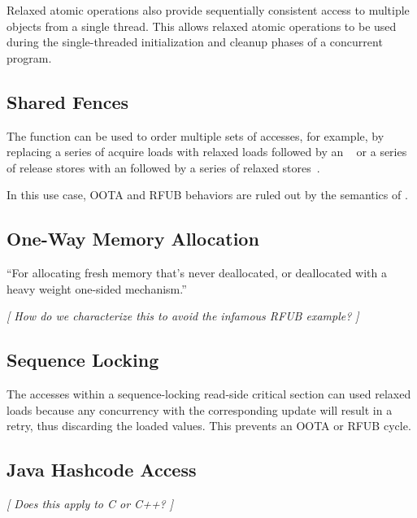\documentclass{article}
\begin{document}
Relaxed atomic operations also provide sequentially consistent access
to multiple objects from a single thread.
This allows relaxed atomic operations to be used during the single-threaded
initialization and cleanup phases of a concurrent program.

\subsection{Shared Fences}
\label{sec:Shared Fences}

The  function can be used to order
multiple sets of accesses, for example, by replacing a series of
acquire loads with relaxed loads followed by an
~\cite[Section 4.1]{RaulSilvera2007WeakMemoryModel}
or a series of release stores with an
 followed by
a series of relaxed stores~\cite[Section 4.2]{RaulSilvera2007WeakMemoryModel}.

In this use case, OOTA and RFUB behaviors are ruled out by the semantics
of .

\subsection{One-Way Memory Allocation}
\label{sec:One-Way Memory Allocation}

``For allocating fresh memory that's never deallocated, or deallocated
with a heavy weight one-sided mechanism.''

\emph{[ How do we characterize this to avoid the infamous RFUB example?  ]}

\subsection{Sequence Locking}
\label{sec:Sequence Locking}

The accesses within a sequence-locking read-side critical section can
used relaxed loads because any concurrency with the corresponding
update will result in a retry, thus discarding the loaded values.
This prevents an OOTA or RFUB cycle.

\subsection{Java Hashcode Access}
\label{sec:Java Hashcode Access}

\emph{[ Does this apply to C or C++? ]}
\end{document}
